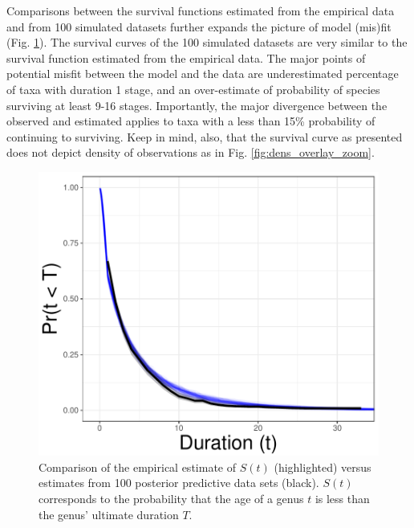 \documentclass[11pt]{article}
\begin{document}
Comparisons between the survival functions estimated from the empirical data and from 100 simulated datasets further expands the picture of model (mis)fit (Fig. \ref{fig:surv}). The survival curves of the 100 simulated datasets are very similar to the survival function estimated from the empirical data. The major points of potential misfit between the model and the data are underestimated percentage of taxa with duration 1 stage, and an over-estimate of probability of species surviving at least 9-16 stages. Importantly, the major divergence between the observed and estimated applies to taxa with a less than 15\% probability of continuing to surviving. Keep in mind, also, that the survival curve as presented does not depict density of observations as in Fig. \ref{fig:dens_overlay_zoom}.

\begin{figure}[ht]
  \centering
  \includegraphics[height = 0.5\textheight,width=\textwidth,keepaspectratio=true]{figure/survival_curves_cweib_cens}
  \caption{Comparison of the empirical estimate of \(S(t)\) (highlighted) versus estimates from 100 posterior predictive data sets (black). \(S(t)\) corresponds to the probability that the age of a genus \(t\) is less than the genus' ultimate duration \(T\). }
  \label{fig:surv}
\end{figure}
\end{document}
